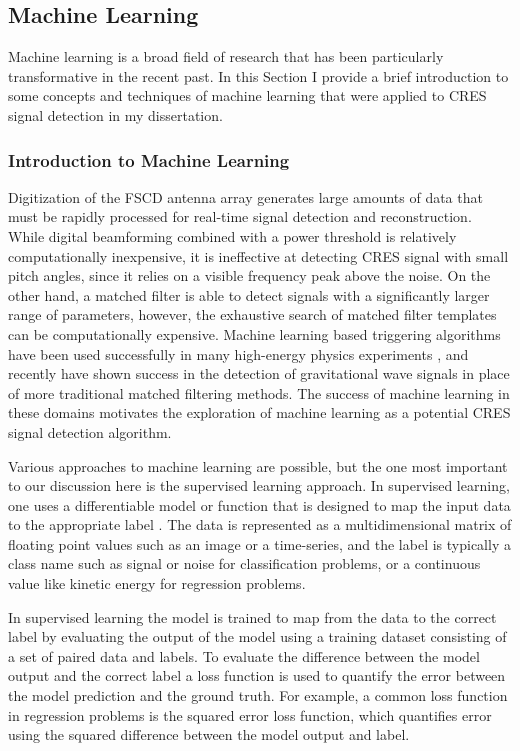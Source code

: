 \subsection{Machine Learning}

Machine learning is a broad field of research \cite{prml} that has been particularly transformative in the recent past. In this Section I provide a brief introduction to some concepts and techniques of machine learning that were applied to CRES signal detection in my dissertation.

\subsubsection*{Introduction to Machine Learning}
\label{sec:chap4-intro-ml}

Digitization of the FSCD antenna array generates large amounts of data that must be rapidly processed for real-time signal detection and reconstruction. While digital beamforming combined with a power threshold is relatively computationally inexpensive, it is ineffective at detecting CRES signal with small pitch angles, since it relies on a visible frequency peak above the noise. On the other hand, a matched filter is able to detect signals with a significantly larger range of parameters, however, the exhaustive search of matched filter templates can be computationally expensive. Machine learning based triggering algorithms have been used successfully in many high-energy physics experiments \cite{ml_lhc}, and recently have shown success in the detection of gravitational wave signals \cite{ml_ligo_1,ml_ligo_2} in place of more traditional matched filtering methods. The success of machine learning in these domains motivates the exploration of machine learning as a potential CRES signal detection algorithm. 

Various approaches to machine learning are possible, but the one most important to our discussion here is the supervised learning approach. In supervised learning, one uses a differentiable model or function that is designed to map the input data to the appropriate label \cite{prml}. The data is represented as a multidimensional matrix of floating point values such as an image or a time-series, and the label is typically a class name such as signal or noise for classification problems, or a continuous value like kinetic energy for regression problems. 

In supervised learning the model is trained to map from the data to the correct label by evaluating the output of the model using a training dataset consisting of a set of paired data and labels. To evaluate the difference between the model output and the correct label a loss function is used to quantify the error between the model prediction and the ground truth. For example, a common loss function in regression problems is the squared error loss function, which quantifies error using the squared difference between the model output and label. 

